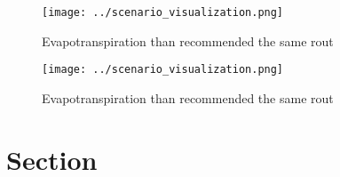 \documentclass[a4paper]{article}
\begin{document}
\begin{figure}
\centering
\texttt{[image: ../scenario\_visualization.png]}
\caption{Evapotranspiration than recommended the same rout
}
\end{figure}
 
\begin{figure}
\centering
\texttt{[image: ../scenario\_visualization.png]}
\caption{Evapotranspiration than recommended the same rout
}
\end{figure}
 
\section{Section}
\end{document}
